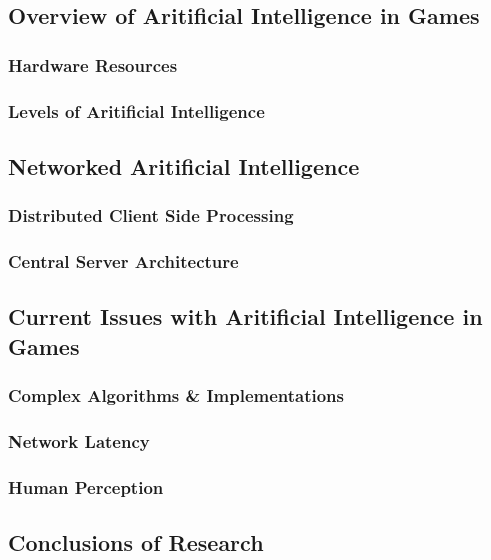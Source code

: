 \documentclass[12pt,a4paper,titlepage]{article}
\begin{document}
\subsection{Overview of Aritificial Intelligence in Games}

\subsubsection{Hardware Resources}

\subsubsection{Levels of Aritificial Intelligence}

\subsection{Networked Aritificial Intelligence}

\subsubsection{Distributed Client Side Processing}

\subsubsection{Central Server Architecture}

\subsection{Current Issues with Aritificial Intelligence in Games}

\subsubsection{Complex Algorithms \& Implementations}

\subsubsection{Network Latency}

\subsubsection{Human Perception}

\subsection{Conclusions of Research}
\end{document}
